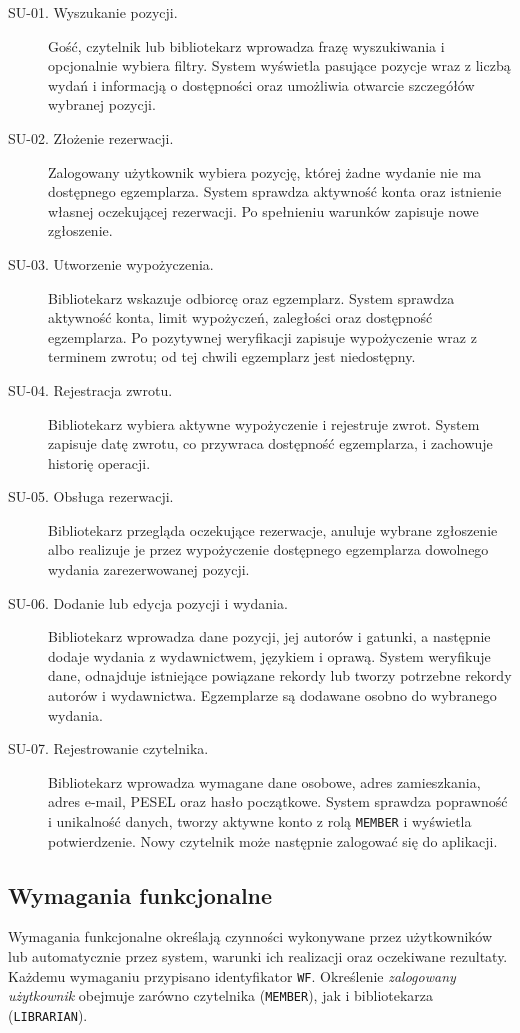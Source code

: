 \documentclass[11pt, a4paper]{article}
\begin{document}
\begin{description}
\item[SU-01. Wyszukanie pozycji.] Gość, czytelnik lub bibliotekarz wprowadza frazę wyszukiwania i opcjonalnie wybiera filtry. System wyświetla pasujące pozycje wraz z liczbą wydań i informacją o dostępności oraz umożliwia otwarcie szczegółów wybranej pozycji.
\item[SU-02. Złożenie rezerwacji.] Zalogowany użytkownik wybiera pozycję, której żadne wydanie nie ma dostępnego egzemplarza. System sprawdza aktywność konta oraz istnienie własnej oczekującej rezerwacji. Po spełnieniu warunków zapisuje nowe zgłoszenie.
\item[SU-03. Utworzenie wypożyczenia.] Bibliotekarz wskazuje odbiorcę oraz egzemplarz. System sprawdza aktywność konta, limit wypożyczeń, zaległości oraz dostępność egzemplarza. Po pozytywnej weryfikacji zapisuje wypożyczenie wraz z terminem zwrotu; od tej chwili egzemplarz jest niedostępny.
\item[SU-04. Rejestracja zwrotu.] Bibliotekarz wybiera aktywne wypożyczenie i rejestruje zwrot. System zapisuje datę zwrotu, co przywraca dostępność egzemplarza, i zachowuje historię operacji.
\item[SU-05. Obsługa rezerwacji.] Bibliotekarz przegląda oczekujące rezerwacje, anuluje wybrane zgłoszenie albo realizuje je przez wypożyczenie dostępnego egzemplarza dowolnego wydania zarezerwowanej pozycji.
\item[SU-06. Dodanie lub edycja pozycji i wydania.] Bibliotekarz wprowadza dane pozycji, jej autorów i gatunki, a następnie dodaje wydania z wydawnictwem, językiem i oprawą. System weryfikuje dane, odnajduje istniejące powiązane rekordy lub tworzy potrzebne rekordy autorów i wydawnictwa. Egzemplarze są dodawane osobno do wybranego wydania.
\item[SU-07. Rejestrowanie czytelnika.] Bibliotekarz wprowadza wymagane dane osobowe, adres zamieszkania, adres e-mail, PESEL oraz hasło początkowe. System sprawdza poprawność i unikalność danych, tworzy aktywne konto z rolą \texttt{MEMBER} i wyświetla potwierdzenie. Nowy czytelnik może następnie zalogować się do aplikacji.
\end{description}

\subsection{Wymagania funkcjonalne}
\label{subsec:wymagania-funkcjonalne}

Wymagania funkcjonalne określają czynności wykonywane przez użytkowników lub automatycznie przez system, warunki ich realizacji oraz oczekiwane rezultaty. Każdemu wymaganiu przypisano identyfikator \texttt{WF}. Określenie \textit{zalogowany użytkownik} obejmuje zarówno czytelnika (\texttt{MEMBER}), jak i bibliotekarza (\texttt{LIBRARIAN}).
\end{document}
